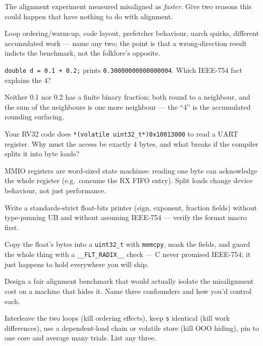 \begin{exercise}\label{ex:m02b}
The alignment experiment measured misaligned as \emph{faster}. Give
two reasons this could happen that have nothing to do with alignment.
\end{exercise}
\begin{solution}[hint]
Loop ordering/warm-up, code layout, prefetcher behaviour, uarch
quirks, different accumulated work --- name any two; the point is that
a wrong-direction result indicts the benchmark, not the folklore's
opposite.
\end{solution}

\begin{exercise}\label{ex:m02c}
\texttt{double d = 0.1 + 0.2;} prints \texttt{0.30000000000000004}.
Which IEEE-754 fact explains the 4?
\end{exercise}
\begin{solution}[hint]
Neither 0.1 nor 0.2 has a finite binary fraction; both round to a
neighbour, and the sum of the neighbours is one more neighbour ---
the ``4'' is the accumulated rounding surfacing.
\end{solution}

\begin{exercise}\label{ex:m02d}
Your RV32 code does \texttt{*(volatile uint32\_t*)0x10013000} to read
a UART register. Why must the access be exactly 4 bytes, and what
breaks if the compiler splits it into byte loads?
\end{exercise}
\begin{solution}[hint]
MMIO registers are word-sized state machines: reading one byte can
acknowledge the whole register (e.g.\ consume the RX FIFO entry).
Split loads change device behaviour, not just performance.
\end{solution}

\begin{exercise}[hard]\label{ex:h02a}
Write a standards-strict float-bits printer (sign, exponent,
fraction fields) without type-punning UB and without assuming
IEEE-754 --- verify the format macro first.
\end{exercise}
\begin{solution}[hint]
Copy the float's bytes into a \texttt{uint32\_t} with
\texttt{memcpy}, mask the fields, and guard the whole thing with a
\texttt{\_\_FLT\_RADIX\_\_} check --- C never promised IEEE-754; it
just happens to hold everywhere you will ship.
\end{solution}

\begin{exercise}[hard]\label{ex:h02b}
Design a fair alignment benchmark that would actually isolate the
misalignment cost on a machine that hides it. Name three confounders
and how you'd control each.
\end{exercise}
\begin{solution}[hint]
Interleave the two loops (kill ordering effects), keep \texttt{s}
identical (kill work differences), use a dependent-load chain or
volatile store (kill OOO hiding), pin to one core and average many
trials. List any three.
\end{solution}

